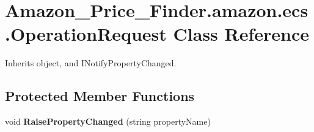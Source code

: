 \hypertarget{class_amazon___price___finder_1_1amazon_1_1ecs_1_1_operation_request}{\section{Amazon\-\_\-\-Price\-\_\-\-Finder.\-amazon.\-ecs.\-Operation\-Request Class Reference}
\label{class_amazon___price___finder_1_1amazon_1_1ecs_1_1_operation_request}
}


 




Inherits object, and I\-Notify\-Property\-Changed.

\subsection*{Protected Member Functions}
\begin{DoxyCompactItemize}
\item 
\hypertarget{class_amazon___price___finder_1_1amazon_1_1ecs_1_1_operation_request_a4a2e2ca0acdf41fad29c4371543161d4}{void {\bfseries Raise\-Property\-Changed} (string property\-Name)}\label{class_amazon___price___finder_1_1amazon_1_1ecs_1_1_operation_request_a4a2e2ca0acdf41fad29c4371543161d4}

\end{DoxyCompactItemize}
